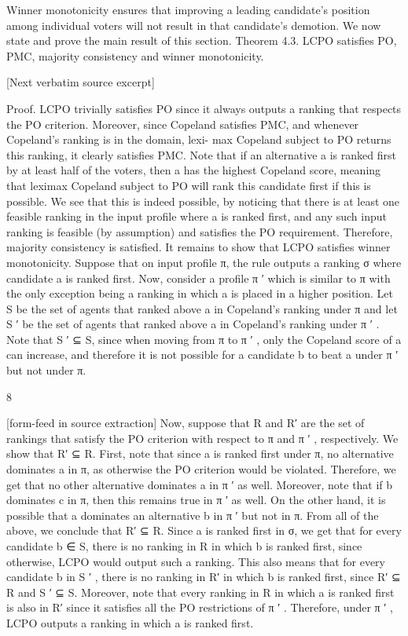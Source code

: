 \documentclass[10pt]{article}
\begin{document}
\begin{ReviewVerbatim}
Winner monotonicity ensures that improving a leading candidate’s position among individual voters
will not result in that candidate’s demotion.
We now state and prove the main result of this section.
Theorem 4.3. LCPO satisfies PO, PMC, majority consistency and winner monotonicity.

[Next verbatim source excerpt]

Proof. LCPO trivially satisfies PO since it always outputs a ranking that respects the PO criterion.
Moreover, since Copeland satisfies PMC, and whenever Copeland’s ranking is in the domain, lexi-
max Copeland subject to PO returns this ranking, it clearly satisfies PMC.
Note that if an alternative a is ranked first by at least half of the voters, then a has the highest
Copeland score, meaning that leximax Copeland subject to PO will rank this candidate first if this is
possible. We see that this is indeed possible, by noticing that there is at least one feasible ranking in
the input profile where a is ranked first, and any such input ranking is feasible (by assumption) and
satisfies the PO requirement. Therefore, majority consistency is satisfied.
It remains to show that LCPO satisfies winner monotonicity. Suppose that on input profile π, the
rule outputs a ranking σ where candidate a is ranked first. Now, consider a profile π ′ which is similar
to π with the only exception being a ranking in which a is placed in a higher position. Let S be the
set of agents that ranked above a in Copeland’s ranking under π and let S ′ be the set of agents that
ranked above a in Copeland’s ranking under π ′ . Note that S ′ ⊆ S, since when moving from π to π ′ ,
only the Copeland score of a can increase, and therefore it is not possible for a candidate b to beat a
under π ′ but not under π.


                                                   8

[form-feed in source extraction]
Now, suppose that R and R′ are the set of rankings that satisfy the PO criterion with respect to π and
π ′ , respectively. We show that R′ ⊆ R. First, note that since a is ranked first under π, no alternative
dominates a in π, as otherwise the PO criterion would be violated. Therefore, we get that no other
alternative dominates a in π ′ as well. Moreover, note that if b dominates c in π, then this remains
true in π ′ as well. On the other hand, it is possible that a dominates an alternative b in π ′ but not in
π. From all of the above, we conclude that R′ ⊆ R.
Since a is ranked first in σ, we get that for every candidate b ∈ S, there is no ranking in R in which
b is ranked first, since otherwise, LCPO would output such a ranking. This also means that for every
candidate b in S ′ , there is no ranking in R′ in which b is ranked first, since R′ ⊆ R and S ′ ⊆ S.
Moreover, note that every ranking in R in which a is ranked first is also in R′ since it satisfies all the
PO restrictions of π ′ . Therefore, under π ′ , LCPO outputs a ranking in which a is ranked first.


\end{ReviewVerbatim}
\end{document}

